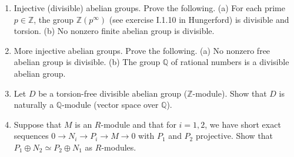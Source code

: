 \documentclass[12pt]{article}
\newcommand{\QQ}{{\mathbb Q}}
\newcommand{\ZZ}{{\mathbb Z}}
\def\defcolor#1{{\color{blue}#1}}
\begin{document}
\begin{enumerate}
 \item \defcolor{Injective (divisible) abelian groups}.  Prove the following.\newline
   (a) For each prime $p\in\ZZ$, the group $\ZZ(p^\infty)$ (see exercise I.1.10 in Hungerford) is divisible and torsion.\newline
   (b) No nonzero finite abelian group is divisible.
   \vspace{-2pt}


 \item \defcolor{More injective abelian groups}.  Prove the following.\newline
   (a) No nonzero free abelian group is divisible.\newline
   (b) The group $\QQ$ of rational numbers is a divisible abelian group.
   \vspace{-2pt}


 \item Let $D$ be a torsion-free divisible abelian group ($\ZZ$-module).
       Show that $D$ is naturally a $\QQ$-module (vector space over $\QQ$).
   \vspace{-2pt}

 \item Suppose that $M$ is an $R$-module and that for $i=1,2$, we have short exact sequences
   $0\to N_i\to P_i\to M\to 0$ with $P_1$ and $P_2$ projective.
   Show that $P_1\oplus N_2\simeq P_2\oplus N_1$ as $R$-modules.
   \vspace{-2pt}

\end{enumerate}
\end{document}
